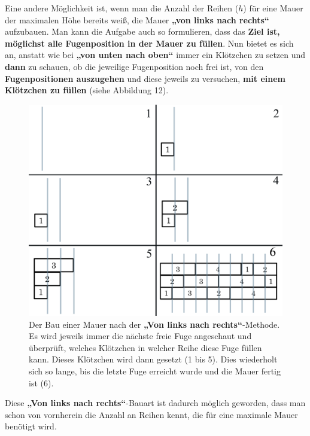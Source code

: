 \documentclass[a4paper,12pt]{article}
\begin{document}
Eine andere Möglichkeit ist, wenn man die Anzahl der Reihen ($h$) für eine Mauer der maximalen Höhe bereits weiß, die Mauer \textbf{„von links nach rechts“} aufzubauen.
Man kann die Aufgabe auch so formulieren, dass das \textbf{Ziel ist, möglichst alle Fugenposition in der Mauer zu füllen}. Nun bietet es sich an, anstatt wie bei \textbf{„von unten nach oben“} immer ein Klötzchen zu setzen und \textbf{dann} zu schauen, ob die jeweilige Fugenposition noch frei ist, von den \textbf{Fugenpositionen auszugehen} und diese jeweils zu versuchen, \textbf{mit einem Klötzchen zu füllen} (siehe Abbildung 12).
\begin{figure}[H]
    \centering
    \includegraphics[width=1\linewidth]{Bilder/Aufgabe1/Definition_Mauerbauart_02.png}
    \caption{Der Bau einer Mauer nach der \textbf{„Von links nach rechts“}-Methode. Es wird jeweils immer die nächste freie Fuge angeschaut und überprüft, welches Klötzchen in welcher Reihe diese Fuge füllen kann. Dieses Klötzchen wird dann gesetzt (1 bis 5). Dies wiederholt sich so lange, bis die letzte Fuge erreicht wurde und die Mauer fertig ist (6).}
\end{figure}

Diese \textbf{„Von links nach rechts“}-Bauart ist dadurch möglich geworden, dass man schon von vornherein die Anzahl an Reihen kennt, die für eine maximale Mauer benötigt wird.
\end{document}
